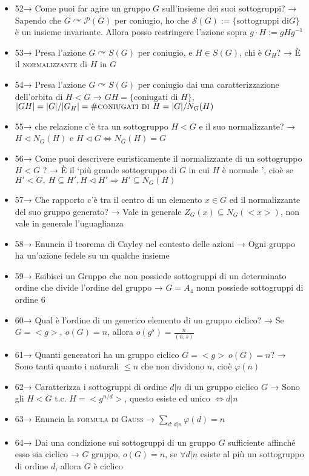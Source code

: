 \documentclass[A4,12pt]{article}
\newcommand{\acts}{\curvearrowright}
\newcommand{\then}{\Rightarrow}
\renewcommand{\iff}{\Leftrightarrow}
\begin{document}
\begin{itemize}[noitemsep]
		\item 52→ Come puoi far agire un gruppo $ G $ sull'insieme dei suoi sottogruppi? → Sapendo che $ G\acts \mathcal{P}(G) $ per coniugio, ho che $ \mathcal{S}(G):=\{\text{sottogruppi di} G\}$ è un insieme invariante. Allora posso restringere l'azione sopra $ g\cdot H := gHg^{-1} $
		\item 53→ Presa l'azione $ G\acts S(G) $ per coniugio, e $ H\in S(G) $, chi è $ G_H $? → È il \textsc{normalizzante} di $ H$ in $ G $  
		\item 54→ Presa l'azione $ G\acts S(G) $ per coniugio dai una caratterizzazione dell'orbita di $ H<G $ → $ GH=\{\text{coniugati di }H\} $, $ |GH| = |G|/|G_H|=\#\textsc{coniugati di }H= |G|/N_G(H) $
		\item 55→ che relazione c'è tra un sottogruppo $ H<G $ e il suo normalizzante? → $ H\lhd N_G(H) $ e $ H\lhd G \iff N_G(H) = G $
		\item 56→ Come puoi descrivere euristicamente il normalizzante di un sottogruppo $ H< G $ ? → È il \enquote*{più grande sottogruppo di $ G $ in cui $ H $ è normale }, cioè se $ H'<G,\ H\subseteq H', H\lhd H' \then H'\subseteq N_G(H)$
		\item 57→ Che rapporto c'è tra il centro di un elemento $ x\in G $ ed il normalizzante del suo gruppo generato? → Vale in generale $ Z_G(x)\subseteq N_G(<x>) $, non vale in generale l'uguaglianza
		\item 58→ Enuncia il teorema di Cayley nel contesto delle azioni → Ogni gruppo ha un'azione fedele su un qualche insieme
		\item 59→ Esibisci un Gruppo che non possiede sottogruppi di un determinato ordine che divide l'ordine del gruppo → $ G=A_4 $ nonn possiede sottogruppi di ordine $ 6 $
		\item 60→ Qual è l'ordine di un generico elemento di un gruppo ciclico? → Se $ G= <g>,\ o(G) =  n$, allora $ o(g^s) = \frac{n}{(n,s)} $ 
		\item 61→ Quanti generatori ha un gruppo ciclico $ G=<g>\ o(G) = n $? → Sono tanti quanto i naturali $ \leq n $ che non dividono $ n $, cioè $ \varphi(n) $
		\item 62→ Caratterizza i sottogruppi di ordine $ d|n $ di un gruppo ciclico $ G $ → Sono gli $ H<G $ t.c. $ H=<g^{n/d}> $, questo esiste ed unico $ \iff d|n$ 
		\item 63→ Enuncia la \textsc{formula di Gauß} → $ \sum\limits_{d:d|n} \varphi(d) = n $
		\item 64→ Dai una condizione sui sottogruppi di un gruppo $ G $ sufficiente affinché esso sia ciclico → $ G $ gruppo, $ o(G) = n  $, se $ \forall d|n $ esiste al più un sottogruppo di ordine $ d $, allora $ G $ è ciclico 

\end{itemize}
\end{document}
